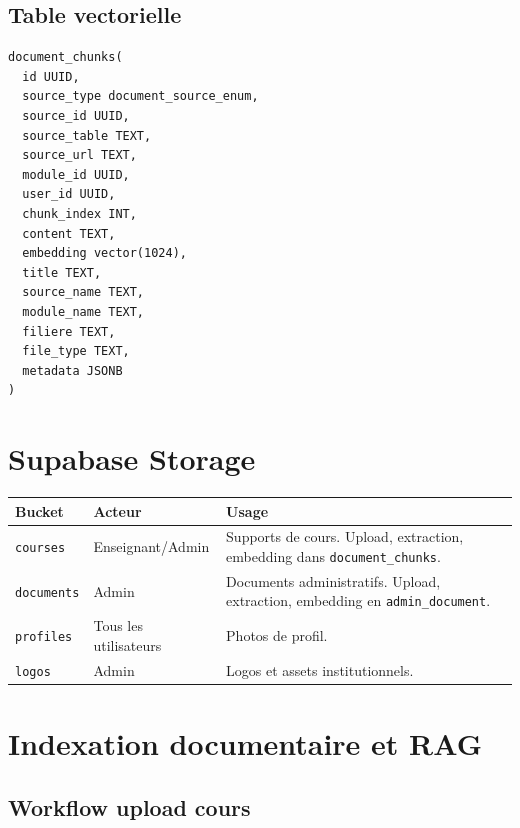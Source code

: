 \documentclass[11pt,a4paper]{article}
\begin{document}
\subsection{Table vectorielle}

\begin{lstlisting}
document_chunks(
  id UUID,
  source_type document_source_enum,
  source_id UUID,
  source_table TEXT,
  source_url TEXT,
  module_id UUID,
  user_id UUID,
  chunk_index INT,
  content TEXT,
  embedding vector(1024),
  title TEXT,
  source_name TEXT,
  module_name TEXT,
  filiere TEXT,
  file_type TEXT,
  metadata JSONB
)
\end{lstlisting}

\section{Supabase Storage}

\begin{longtable}{p{3cm}p{4cm}p{7cm}}
\toprule
\textbf{Bucket} & \textbf{Acteur} & \textbf{Usage}\\
\midrule
\texttt{courses} & Enseignant/Admin & Supports de cours. Upload, extraction, embedding dans \texttt{document\_chunks}.\\
\texttt{documents} & Admin & Documents administratifs. Upload, extraction, embedding en \texttt{admin\_document}.\\
\texttt{profiles} & Tous les utilisateurs & Photos de profil.\\
\texttt{logos} & Admin & Logos et assets institutionnels.\\
\bottomrule
\end{longtable}

\section{Indexation documentaire et RAG}

\subsection{Workflow upload cours}
\end{document}
